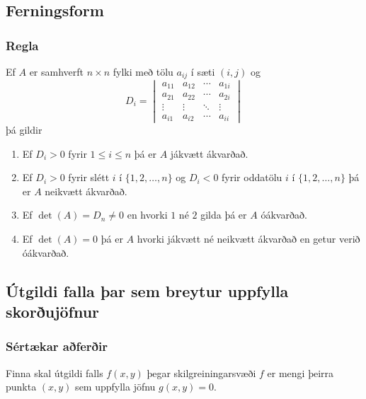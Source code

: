  
\subsection{Ferningsform}  

\subsubsection{Regla  }
Ef $A$ er samhverft $n \times n$ fylki með tölu $a_{ij}$ í sæti $(i,j)$ og
\begin {equation*}
 D_i = \begin{vmatrix}
        a_{11} & a_{12} & \cdots & a_{1i} \\
        a_{21} & a_{22} & \cdots & a_{2i} \\
        \vdots & \vdots & \ddots & \vdots \\ 
        a_{i1} & a_{i2} & \cdots & a_{ii} 
       \end{vmatrix}
\end {equation*}
þá gildir
\begin {enumerate}
 \item Ef $D_i > 0$ fyrir $1\leq i \leq n$ þá er $A$ jákvætt ákvarðað.
 \item Ef $D_i > 0$ fyrir slétt $i$ í $\{1,2,\ldots,n\}$ og $D_i < 0$ fyrir oddatölu $i$ í $\{1,2,\ldots,n\}$ þá er $A$ neikvætt ákvarðað.
 \item Ef $\det(A) = D_n \neq 0$ en hvorki $1$ né $2$ gilda þá er $A$ óákvarðað. 
 \item Ef $\det(A) = 0$ þá er $A$ hvorki jákvætt né neikvætt ákvarðað en getur verið óákvarðað.
\end {enumerate}




\subsection{Útgildi falla þar sem breytur uppfylla skorðujöfnur} 

\subsubsection{Sértækar aðferðir  }
Finna skal útgildi falls $f(x,y)$ þegar skilgreiningarsvæði $f$ er mengi þeirra punkta $(x,y)$ sem uppfylla jöfnu $g(x,y)=0$.  


